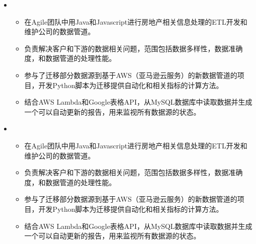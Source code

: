 \documentclass[11pt,a4paper,sans]{moderncv}        %
\begin{document}
\begin{itemize}
\vspace{2pt}

\item{

\begin{itemize}
\item{在Agile团队中用Java和Javascript进行房地产相关信息处理的ETL开发和维护公司的数据管道。}
\vspace{2pt}
\item{负责解决客户和下游的数据相关问题，范围包括数据多样性，数据准确度，和数据管道的处理性能。}
\vspace{2pt}
\item{参与了迁移部分数据源到基于AWS（亚马逊云服务）的新数据管道的项目，开发Python脚本为迁移提供自动化和相关指标的计算方法。}
\vspace{2pt}
\item{结合AWS Lambda和Google表格API，从MySQL数据库中读取数据并生成一个可以自动更新的报告，用来监视所有数据源的状态。}

\end{itemize}}

\item{

\begin{itemize}
\item{在Agile团队中用Java和Javascript进行房地产相关信息处理的ETL开发和维护公司的数据管道。}
\vspace{2pt}
\item{负责解决客户和下游的数据相关问题，范围包括数据多样性，数据准确度，和数据管道的处理性能。}
\vspace{2pt}
\item{参与了迁移部分数据源到基于AWS（亚马逊云服务）的新数据管道的项目，开发Python脚本为迁移提供自动化和相关指标的计算方法。}
\vspace{2pt}
\item{结合AWS Lambda和Google表格API，从MySQL数据库中读取数据并生成一个可以自动更新的报告，用来监视所有数据源的状态。}

\end{itemize}}
\end{itemize}
\end{document}
